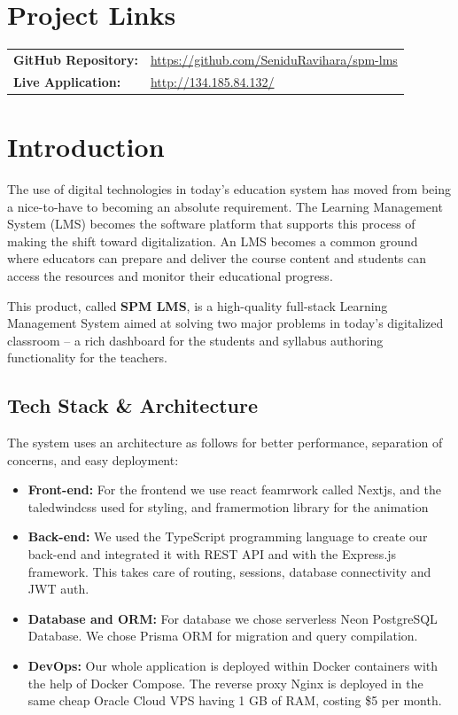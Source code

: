 \documentclass[12pt,a4paper]{article}
\begin{document}
\newpage
\tableofcontents
\newpage

\section*{Project Links}
\begin{tabular}{ll}
    \textbf{GitHub Repository:} & \url{https://github.com/SeniduRavihara/spm-lms} \\[6pt]
    \textbf{Live Application:}  & \url{http://134.185.84.132/} \\
\end{tabular}
\vspace{1cm}

\section{Introduction}
The use of digital technologies in today’s education system has moved from being a nice-to-have to becoming an absolute requirement. The Learning Management System (LMS) becomes the software platform that supports this process of making the shift toward digitalization. An LMS becomes a common ground where educators can prepare and deliver the course content and students can access the resources and monitor their educational progress.

This product, called \textbf{SPM LMS}, is a high-quality full-stack Learning Management System aimed at solving two major problems in today’s digitalized classroom – a rich dashboard for the students and syllabus authoring functionality for the teachers.

\subsection{Tech Stack \& Architecture}
The system uses an architecture as follows for better performance, separation of concerns, and easy deployment:
\begin{itemize}
    \item \textbf{Front-end:} For the frontend we use react feamrwork called Nextjs, and the taledwindcss used for styling, and framermotion library for the animation
    \item \textbf{Back-end:} We used the TypeScript programming language to create our back-end and integrated it with REST API and with the Express.js framework. This takes care of routing, sessions, database connectivity and JWT auth. 
    \item \textbf{Database and ORM:} For database we chose serverless Neon PostgreSQL Database. We chose Prisma ORM for migration and query compilation.
    \item \textbf{DevOps:} Our whole application is deployed within Docker containers with the help of Docker Compose. The reverse proxy Nginx is deployed in the same cheap Oracle Cloud VPS having 1 GB of RAM, costing \$5 per month.
\end{itemize}
\end{document}
